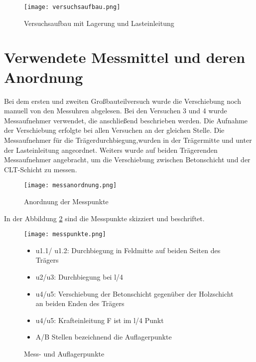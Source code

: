 \documentclass[12 pt,a4 paper ]{scrreprt}
\begin{document}
\begin{figure}[h]
\begin{center}
\texttt{[image: versuchsaufbau.png]}
\caption{Versuchsaufbau mit Lagerung und Lasteinleitung}
\label{versuchsaufbau}
\end{center}
\end{figure}

\section{Verwendete Messmittel und deren Anordnung}

Bei dem ersten und zweiten Großbauteilversuch wurde die Verschiebung noch manuell von den Messuhren abgelesen. Bei den Versuchen 3 und 4 wurde Messaufnehmer verwendet, die anschließend beschrieben werden. Die Aufnahme der Verschiebung erfolgte bei allen Versuchen an der gleichen Stelle. Die Messaufnehmer für die Trägerdurchbiegung,wurden in der Trägermitte und unter der Lasteinleitung angeordnet. Weiters wurde auf beiden Trägerenden Messaufnehmer angebracht, um die Verschiebung zwischen Betonschicht und der CLT-Schicht zu messen.

\begin{figure}[h]
\begin{center}
\texttt{[image: messanordnung.png]}
\caption{Anordnung der Messpunkte}
\label{versuchsaufbau}
\end{center}
\end{figure}

In der Abbildung \ref{versuchsaufbau} sind die Messpunkte skizziert und beschriftet.

\begin{figure}[h]
\begin{minipage}[hbt]{8cm}
	\texttt{[image: messpunkte.png]}
	\caption{Mess- und Auflagerpunkte}
	\label{messpunkte}
\end{minipage}
\hfill
\begin{minipage}[hbt]{7cm}
	\begin{itemize}
	\item u1.1/ u1.2: Durchbiegung in Feldmitte 	auf beiden Seiten des Trägers
	\item u2/u3: Durchbiegung bei l/4
	\item u4/u5: Verschiebung der Betonschicht 	gegenüber der Holzschicht an beiden 	Enden des Trägers
	\item u4/u5: Krafteinleitung F ist im l/4 Punkt
	\item A/B Stellen bezeichnend die 	Auflagerpunkte 
	\end{itemize}

	
\end{minipage}
\end{figure}
\end{document}
